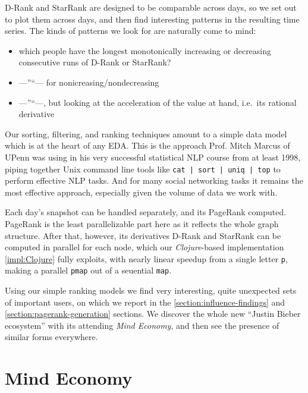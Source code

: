 \documentclass[10pt,oneside]{memoir}
\begin{document}
\begin{Spacing}{2}
D-Rank and StarRank are designed to be comparable across days, so we set out to plot them across days, and then find interesting patterns in the resulting time series.  The kinds of patterns we look for are naturally come to mind:


\begin{itemize}


\item which people have the longest monotonically increasing or decreasing consecutive runs of D-Rank or StarRank?

\item ---''``--- for nonicreasing/nondecreasing

\item ---''``---, but looking at the acceleration of the value at hand, i.e.\ its rational derivative
\end{itemize}

Our sorting, filtering, and ranking techniques amount to a simple data model which is at the heart of any EDA.  This is the approach Prof. Mitch Marcus of UPenn was using in his very successful statistical NLP course from at least 1998, piping together Unix command line tools like \texttt{cat | sort | uniq | top} to perform effective NLP tasks.  And for many social networking tasks it remains the most effective approach, especially given the volume of data we work with.  


Each day's snapshot can be handled separately, and its PageRank computed.  PageRank is the least parallelizable part here as it reflects the whole graph structure.  After that, however, its derivatives D-Rank and StarRank can be computed in parallel for each node, which our {\itshape Clojure}-based implementation \ref{impl:Clojure} fully exploits, with nearly linear speedup from a single letter \texttt{p}, making a parallel \texttt{pmap} out of a seuential \texttt{map}.


Using our simple ranking models we find very interesting, quite unexpected sets of important users, on which we report in the \ref{section:influence-findings} and \ref{section:pagerank-generation} sections.  We discover the whole new ``Justin Bieber ecosystem'' with its attending {\itshape Mind Economy}, and then see the presence of similar forms everywhere.


\pagebreak \section{Mind Economy}
\label{mindeconomy}


\end{Spacing}
\end{document}
